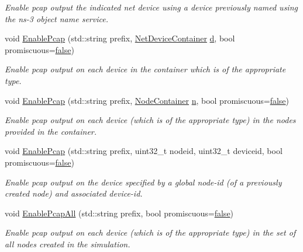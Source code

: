 \begin{DoxyCompactItemize}
\begin{DoxyCompactList}\small\item\em Enable pcap output the indicated net device using a device previously named using the ns-\/3 object name service. \end{DoxyCompactList}\item 
void \hyperlink{classns3_1_1PcapHelperForDevice_ac900ad330cbebe256309600a44a57186}{Enable\+Pcap} (std\+::string prefix, \hyperlink{classns3_1_1NetDeviceContainer}{Net\+Device\+Container} \hyperlink{lte__pathloss_8m_a1aabac6d068eef6a7bad3fdf50a05cc8}{d}, bool promiscuous=\hyperlink{lte__cqi__generation_8m_ab1bef239d413c4da139c4bac92cd657a}{false})
\begin{DoxyCompactList}\small\item\em Enable pcap output on each device in the container which is of the appropriate type. \end{DoxyCompactList}\item 
void \hyperlink{classns3_1_1PcapHelperForDevice_aaff226f8b35b0aba2fb5adb562ebc093}{Enable\+Pcap} (std\+::string prefix, \hyperlink{classns3_1_1NodeContainer}{Node\+Container} \hyperlink{lte__link__budget__x2__handover__measures_8m_abdb05bc5a064cf642a06c83b3392f148}{n}, bool promiscuous=\hyperlink{lte__cqi__generation_8m_ab1bef239d413c4da139c4bac92cd657a}{false})
\begin{DoxyCompactList}\small\item\em Enable pcap output on each device (which is of the appropriate type) in the nodes provided in the container. \end{DoxyCompactList}\item 
void \hyperlink{classns3_1_1PcapHelperForDevice_a0f05dc8e6d51f6464637c02b358a5cc1}{Enable\+Pcap} (std\+::string prefix, uint32\+\_\+t nodeid, uint32\+\_\+t deviceid, bool promiscuous=\hyperlink{lte__cqi__generation_8m_ab1bef239d413c4da139c4bac92cd657a}{false})
\begin{DoxyCompactList}\small\item\em Enable pcap output on the device specified by a global node-\/id (of a previously created node) and associated device-\/id. \end{DoxyCompactList}\item 
void \hyperlink{classns3_1_1PcapHelperForDevice_a4ab183a2512120200d4a0e5d8ececd49}{Enable\+Pcap\+All} (std\+::string prefix, bool promiscuous=\hyperlink{lte__cqi__generation_8m_ab1bef239d413c4da139c4bac92cd657a}{false})
\begin{DoxyCompactList}\small\item\em Enable pcap output on each device (which is of the appropriate type) in the set of all nodes created in the simulation. \end{DoxyCompactList}\end{DoxyCompactItemize}


